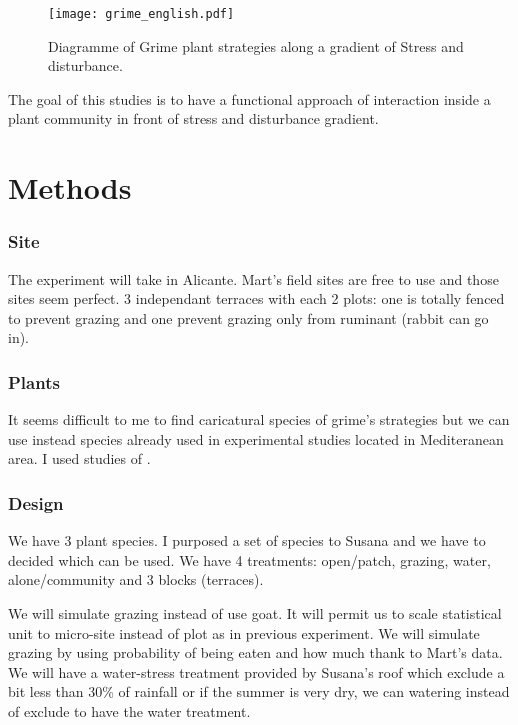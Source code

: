 \documentclass[12pt]{article} %
\begin{document}
\begin{figure}
\begin{center}
\texttt{[image: grime\_english.pdf]}
\end{center}
\caption{Diagramme of Grime plant strategies along a gradient of Stress and disturbance.\label{Grime}}
\end{figure}



The goal of this studies is to have a functional approach of interaction inside a plant community in front of stress and disturbance gradient.


\part{Methods}

\section{Site}

The experiment will take in Alicante. Mart's field sites are free to use and those sites seem perfect. 3 independant terraces with each 2 plots: one is totally fenced to prevent grazing and one prevent grazing only from ruminant (rabbit can go in). 

\section{Plants}

It seems difficult to me to find caricatural species of grime's strategies but we can use instead species already used in experimental studies located in Mediteranean area.
I used studies of \citep{McCluney2012,Navarro2006, Jauffret2003}.



\section{Design}

We have 3 plant species. I purposed a set of species to Susana and we have to decided which can be used. We have 4 treatments: open/patch, grazing, water, alone/community and 3 blocks (terraces).

 We will simulate grazing instead of use goat. It will permit us to scale statistical unit to micro-site instead of plot as in previous experiment. We will simulate grazing by using probability of being eaten and how much thank to Mart's data. 
We will have a water-stress treatment provided by Susana's roof which exclude a bit less than 30\% of rainfall or if the summer is very dry, we can watering instead of exclude to have the water treatment.
\end{document}
